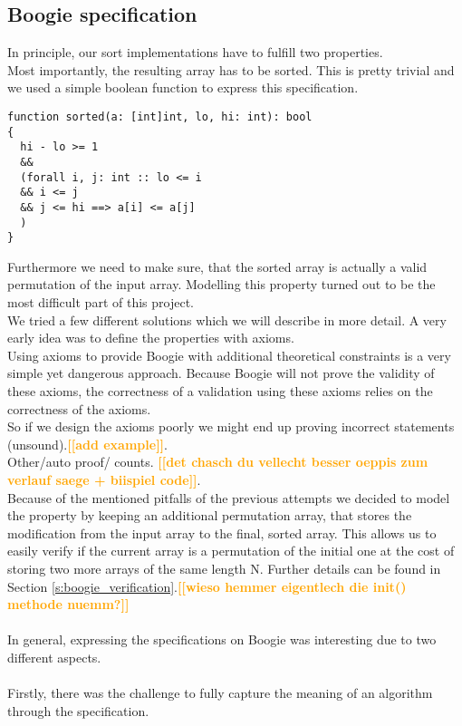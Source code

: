\documentclass{report}
\newcommand{\todo}[1]{\textsf{\textbf{\textcolor{orange}{[[#1]]}}}}
\begin{document}
\subsection{Boogie specification}
In principle, our sort implementations have to fulfill two properties.\\
Most importantly, the resulting array has to be sorted. This is pretty trivial and we used
a simple boolean function to express this specification.
\begin{lstlisting}
function sorted(a: [int]int, lo, hi: int): bool
{
  hi - lo >= 1
  &&
  (forall i, j: int :: lo <= i 
  && i <= j 
  && j <= hi ==> a[i] <= a[j]
  )
}
\end{lstlisting}
Furthermore we need to make sure, that the sorted array is actually a valid
permutation of the input array. Modelling this property turned out to be the most difficult part
of this project.\\
We tried a few different solutions which we will describe in more detail.
A very early idea was to define the properties with axioms.\\ 
Using axioms to provide Boogie with additional theoretical constraints is a very simple yet dangerous approach. Because Boogie will not prove the validity of these axioms, the correctness of a validation using these axioms relies on the correctness of the axioms.\\
So if we design the axioms poorly we might end up proving incorrect statements (unsound).\todo{add example}.\\
Other/auto proof/ counts. \todo{det chasch du vellecht besser oeppis zum verlauf saege + biispiel code}.\\
Because of the mentioned pitfalls of the previous attempts we decided to model the property by keeping an additional permutation array, that stores the modification from the input array to the final, sorted array. This allows us to easily verify if the current array is a permutation of the initial one at the cost of storing two more arrays of the same length N. Further details can be found in Section \ref{s:boogie_verification}.\todo{wieso hemmer eigentlech die init() methode nuemm?}
\\\\
In general, expressing the specifications on Boogie was interesting due to two different aspects.
\\
\\
Firstly, there was the challenge to fully capture the meaning of an algorithm
through the specification.\\
\end{document}
